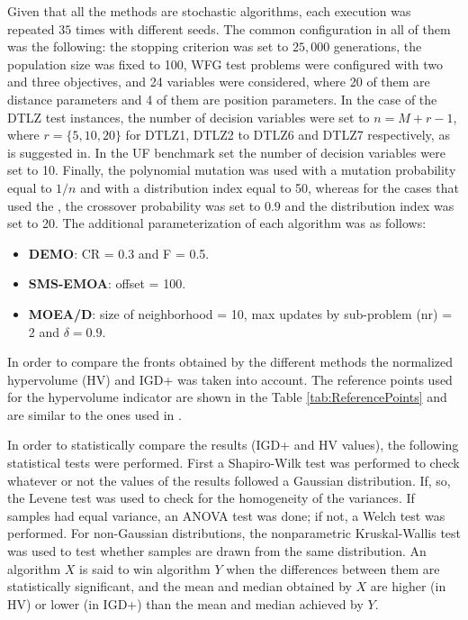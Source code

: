 Given that all the methods are stochastic algorithms, each execution was repeated $35$ times with different seeds.
%
The common configuration in all of them was the following: the stopping criterion was set to $25,000$ generations, 
the population size was fixed to 100, WFG test problems were configured with two and three objectives, and 24 variables
were considered, where 20 of them are distance parameters and 4 of them are position parameters.
%
In the case of the DTLZ test instances, the number of decision variables were set to $n=M+r-1$, where $r=\{5, 10, 20\}$ 
for DTLZ1, DTLZ2 to DTLZ6 and DTLZ7 respectively, as is suggested in\cite{Joel:DTLZ_2}.  
% 
In the UF benchmark set the number of decision variables were set to 10.
%
Finally, the polynomial mutation was used with a mutation probability equal to $1/n$ and with a distribution index equal to 50, 
whereas for the cases that used the \SBX{}, the crossover probability was set to $0.9$ and the distribution index
was set to 20.
%
The additional parameterization of each algorithm was as follows:
\begin{itemize}
\item \textbf{DEMO}: CR = 0.3 and F = 0.5.
\item \textbf{SMS-EMOA}: offset = 100.
\item \textbf{MOEA/D}: size of neighborhood = 10, max updates by sub-problem (nr) = 2 and $\delta = 0.9$.
\end{itemize}

In order to compare the fronts obtained by the different methods the 
normalized hypervolume (HV) and IGD+ was taken into account.
%
The reference points used for the hypervolume indicator are shown in the Table \ref{tab:ReferencePoints} 
and are similar to the ones used in \cite{Joel:Kuhn_Munkres, Joel:OperatorAHX}.

In order to statistically compare the results (IGD+ and HV values), the following statistical tests were performed. 
%
First a Shapiro-Wilk test was performed to check whatever or not the values of the results followed a Gaussian distribution. 
%
If, so, the Levene test was used to check for the homogeneity of the variances. 
%
If samples had equal variance, an ANOVA test was done; if not, a Welch test was performed. 
%
For non-Gaussian distributions, the nonparametric Kruskal-Wallis test was used to test whether samples are drawn 
from the same distribution. 
%
An algorithm $X$ is said to win algorithm $Y$ when the differences between them are statistically significant, and
the mean and median obtained by $X$ are higher (in HV) or lower (in IGD+) than the mean and median achieved by $Y$.


